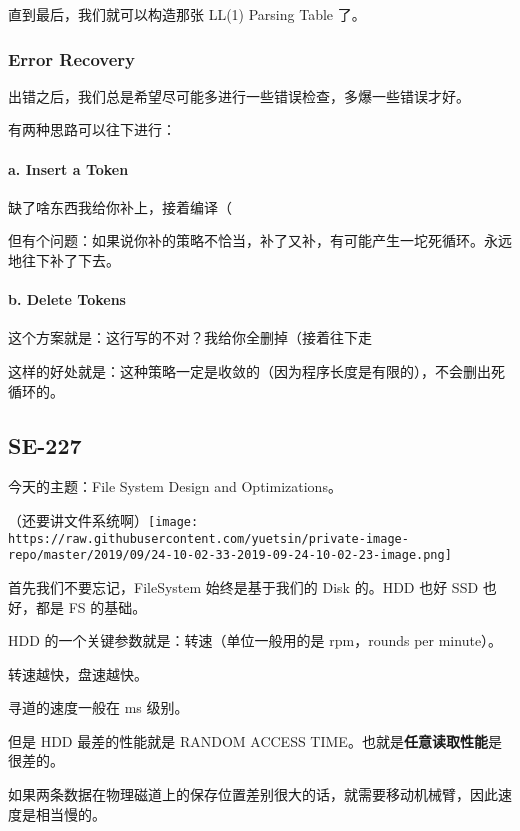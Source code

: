 \documentclass[
]{article}
\begin{document}
直到最后，我们就可以构造那张 LL(1) Parsing Table 了。

\hypertarget{header-n113}{%
\subsubsection{Error Recovery}\label{header-n113}}

出错之后，我们总是希望尽可能多进行一些错误检查，多爆一些错误才好。

有两种思路可以往下进行：

\hypertarget{header-n116}{%
\paragraph{a. Insert a Token}\label{header-n116}}

缺了啥东西我给你补上，接着编译（

但有个问题：如果说你补的策略不恰当，补了又补，有可能产生一坨死循环。永远地往下补了下去。

\hypertarget{header-n119}{%
\paragraph{b. Delete Tokens}\label{header-n119}}

这个方案就是：这行写的不对？我给你全删掉（接着往下走

这样的好处就是：这种策略一定是收敛的（因为程序长度是有限的），不会删出死循环的。

\hypertarget{header-n123}{%
\subsection{SE-227}\label{header-n123}}

今天的主题：File System Design and Optimizations。

（还要讲文件系统啊）\texttt{[image: https://raw.githubusercontent.com/yuetsin/private-image-repo/master/2019/09/24-10-02-33-2019-09-24-10-02-23-image.png]}

首先我们不要忘记，FileSystem 始终是基于我们的 Disk 的。HDD 也好 SSD
也好，都是 FS 的基础。

HDD 的一个关键参数就是：转速（单位一般用的是 rpm，rounds per minute）。

转速越快，盘速越快。

寻道的速度一般在 ms 级别。

但是 HDD 最差的性能就是 RANDOM ACCESS
TIME。也就是\textbf{任意读取性能}是很差的。

如果两条数据在物理磁道上的保存位置差别很大的话，就需要移动机械臂，因此速度是相当慢的。
\end{document}
